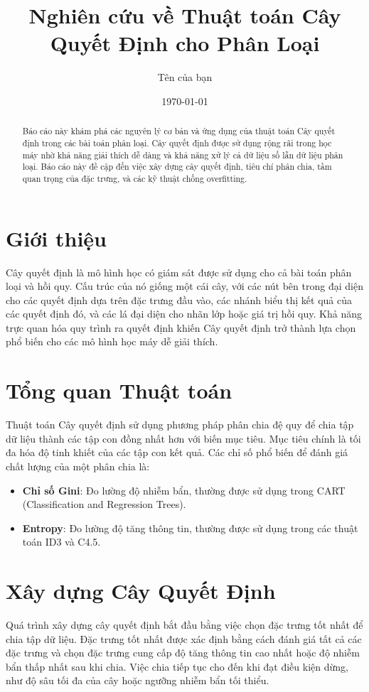 \documentclass{article}
\title{Nghiên cứu về Thuật toán Cây Quyết Định cho Phân Loại}
\author{Tên của bạn}
\date{\today}
\begin{document}
\maketitle

\begin{abstract}
Báo cáo này khám phá các nguyên lý cơ bản và ứng dụng của thuật toán Cây quyết định trong các bài toán phân loại. Cây quyết định được sử dụng rộng rãi trong học máy nhờ khả năng giải thích dễ dàng và khả năng xử lý cả dữ liệu số lẫn dữ liệu phân loại. Báo cáo này đề cập đến việc xây dựng cây quyết định, tiêu chí phân chia, tầm quan trọng của đặc trưng, và các kỹ thuật chống overfitting.
\end{abstract}

\section{Giới thiệu}
Cây quyết định là mô hình học có giám sát được sử dụng cho cả bài toán phân loại và hồi quy. Cấu trúc của nó giống một cái cây, với các nút bên trong đại diện cho các quyết định dựa trên đặc trưng đầu vào, các nhánh biểu thị kết quả của các quyết định đó, và các lá đại diện cho nhãn lớp hoặc giá trị hồi quy. Khả năng trực quan hóa quy trình ra quyết định khiến Cây quyết định trở thành lựa chọn phổ biến cho các mô hình học máy dễ giải thích.

\section{Tổng quan Thuật toán}
Thuật toán Cây quyết định sử dụng phương pháp phân chia đệ quy để chia tập dữ liệu thành các tập con đồng nhất hơn với biến mục tiêu. Mục tiêu chính là tối đa hóa độ tinh khiết của các tập con kết quả. Các chỉ số phổ biến để đánh giá chất lượng của một phân chia là:

\begin{itemize}
    \item \textbf{Chỉ số Gini}: Đo lường độ nhiễm bẩn, thường được sử dụng trong CART (Classification and Regression Trees).
    \item \textbf{Entropy}: Đo lường độ tăng thông tin, thường được sử dụng trong các thuật toán ID3 và C4.5.
\end{itemize}

\section{Xây dựng Cây Quyết Định}
Quá trình xây dựng cây quyết định bắt đầu bằng việc chọn đặc trưng tốt nhất để chia tập dữ liệu. Đặc trưng tốt nhất được xác định bằng cách đánh giá tất cả các đặc trưng và chọn đặc trưng cung cấp độ tăng thông tin cao nhất hoặc độ nhiễm bẩn thấp nhất sau khi chia. Việc chia tiếp tục cho đến khi đạt điều kiện dừng, như độ sâu tối đa của cây hoặc ngưỡng nhiễm bẩn tối thiểu.
\end{document}
